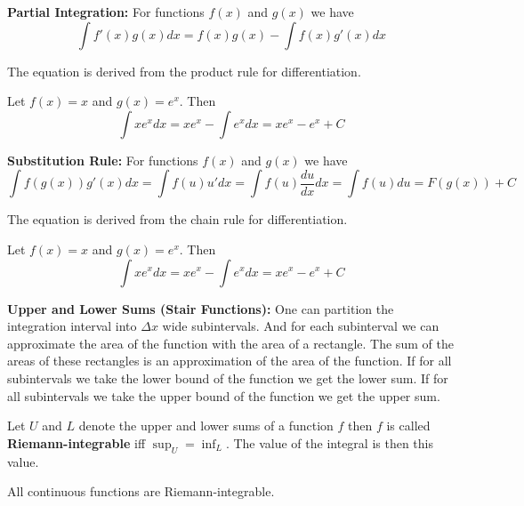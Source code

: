 \begin{theorem}
    \textbf{Partial Integration:} For functions $f(x)$ and $g(x)$ we have
    $$\int f'(x)g(x)dx = f(x)g(x) - \int f(x)g'(x)dx $$
\end{theorem}

\begin{remark}
    The equation is derived from the product rule for differentiation. 
\end{remark}

\begin{example}
    Let $f(x) = x$ and $g(x) = e^x$. Then 
    $$\int x e^x dx = x e^x - \int e^x dx = x e^x - e^x + C$$
\end{example}

\begin{theorem}
    \textbf{Substitution Rule:} For functions $f(x)$ and $g(x)$ we have
    $$\int f(g(x))g'(x)dx  = \int f(u) u' dx = \int f(u) \frac{du}{dx} dx = \int f(u) du = F(g(x)) + C $$
\end{theorem}

\begin{remark}
    The equation is derived from the chain rule for differentiation. 
\end{remark}

\begin{example}
    Let $f(x) = x$ and $g(x) = e^x$. Then 
    $$\int x e^x dx = x e^x - \int e^x dx = x e^x - e^x + C$$
\end{example}

\begin{remark}
    \textbf{Upper and Lower Sums (Stair Functions):} One can partition the integration interval into $\Delta x$ wide subintervals. And for each subinterval we can approximate the area of the function with the area of a rectangle. The sum of the areas of these rectangles is an approximation of the area of the function. If for all subintervals we take the lower bound of the function we get the lower sum. If for all subintervals we take the upper bound of the function we get the upper sum.
\end{remark}

\begin{definition}
    Let $U$ and $L$ denote the upper and lower sums of a function $f$ then 
    $f$ is called \textbf{Riemann-integrable} iff $\sup_{U} = \inf_{L}$. The value of the integral is then this value.
\end{definition}

\begin{remark}
    All continuous functions are Riemann-integrable. 
\end{remark}

